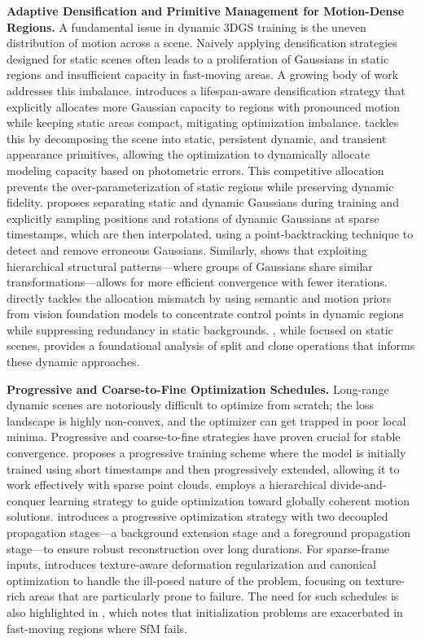 \documentclass[11pt]{article}
\begin{document}
\textbf{Adaptive Densification and Primitive Management for Motion-Dense Regions.} A fundamental issue in dynamic 3DGS training is the uneven distribution of motion across a scene. Naively applying densification strategies designed for static scenes often leads to a proliferation of Gaussians in static regions and insufficient capacity in fast-moving areas. A growing body of work addresses this imbalance. \cite{ref373} introduces a lifespan-aware densification strategy that explicitly allocates more Gaussian capacity to regions with pronounced motion while keeping static areas compact, mitigating optimization imbalance. \cite{ref374} tackles this by decomposing the scene into static, persistent dynamic, and transient appearance primitives, allowing the optimization to dynamically allocate modeling capacity based on photometric errors. This competitive allocation prevents the over-parameterization of static regions while preserving dynamic fidelity. \cite{ref375} proposes separating static and dynamic Gaussians during training and explicitly sampling positions and rotations of dynamic Gaussians at sparse timestamps, which are then interpolated, using a point-backtracking technique to detect and remove erroneous Gaussians. Similarly, \cite{ref376} shows that exploiting hierarchical structural patterns---where groups of Gaussians share similar transformations---allows for more efficient convergence with fewer iterations. \cite{ref377} directly tackles the allocation mismatch by using semantic and motion priors from vision foundation models to concentrate control points in dynamic regions while suppressing redundancy in static backgrounds. \cite{ref143}, while focused on static scenes, provides a foundational analysis of split and clone operations that informs these dynamic approaches.

\textbf{Progressive and Coarse-to-Fine Optimization Schedules.} Long-range dynamic scenes are notoriously difficult to optimize from scratch; the loss landscape is highly non-convex, and the optimizer can get trapped in poor local minima. Progressive and coarse-to-fine strategies have proven crucial for stable convergence. \cite{ref375} proposes a progressive training scheme where the model is initially trained using short timestamps and then progressively extended, allowing it to work effectively with sparse point clouds. \cite{ref378} employs a hierarchical divide-and-conquer learning strategy to guide optimization toward globally coherent motion solutions. \cite{ref379} introduces a progressive optimization strategy with two decoupled propagation stages---a background extension stage and a foreground propagation stage---to ensure robust reconstruction over long durations. For sparse-frame inputs, \cite{ref380} introduces texture-aware deformation regularization and canonical optimization to handle the ill-posed nature of the problem, focusing on texture-rich areas that are particularly prone to failure. The need for such schedules is also highlighted in \cite{ref381}, which notes that initialization problems are exacerbated in fast-moving regions where SfM fails.
\end{document}
